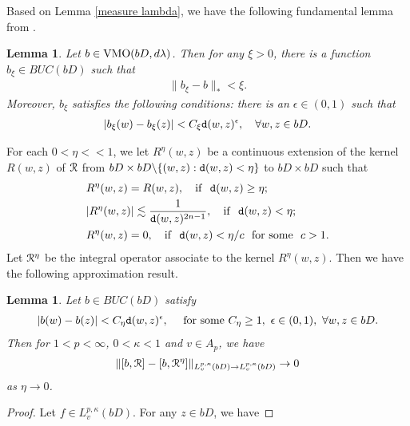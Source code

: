 \documentclass[11pt,a4paper]{amsart}
\numberwithin{equation}{section}
\newtheorem{lemma}[theorem]{Lemma}
\begin{document}
{Based on Lemma \ref{measure lambda}, we have the following  fundamental lemma from \cite[Lemma 1.2]{KL2}. %
\begin{lemma}\label{lemma 1 KL2}
Let $b\in{\rm VMO}(bD, d\lambda)$. Then for any $\xi>0$, there is a function $b_\xi\in BUC(bD)$ such that
\begin{align}\label{f_eta -f}
\|b_\xi -b\|_*<\xi.
\end{align}
Moreover, $b_\xi$ satisfies the following conditions: there is an $\epsilon\in (0,1)$ such that
\begin{align}\label{f_eta}
|b_\xi(w) -b_\xi(z)|<C_\xi {\tt d}(w,z)^\epsilon,\quad \forall w,z\in bD.
\end{align}
\end{lemma}
For each $0<\eta<<1$, we let
$R^\eta(w,z)$ be a continuous extension of the kernel $R(w,z)$ of $\EuScript R$ from $bD\times bD\backslash \{(w,z): {\tt d}(w,z)<\eta\}$ to $bD\times bD$ such that
\begin{align*}
&R^\eta(w,z) =R(w,z),\quad {\rm if}\ \ {\tt d}(w,z)\geq\eta;\\
&|R^\eta(w,z)|\lesssim {1\over {\tt d}(w,z)^{2n-1}}, \quad {\rm if}\ \  {\tt d}(w,z)<\eta;\\
& R^\eta(w,z)=0, \quad {\rm if}\ \  {\tt d}(w,z)<\eta/c\ \ {\text {for some}}\ \ c>1.
\end{align*}
Let $\EuScript R^\eta$ be the integral operator associate to the kernel $R^\eta(w,z)$.
Then we have the following approximation result.
\begin{lemma}\label{lemma 2 KL2}
Let $b\in BUC(bD)$ satisfy
\begin{align}\label{f_eta 1}
|b(w) -b(z)|<C_\eta {\tt d}(w,z)^\epsilon,\quad {\rm\ for\ some\ } C_\eta\geq1,\ \epsilon\in(0,1),\ \forall w,z\in bD.
\end{align}
Then for $1<p<\infty$, $0<\kappa<1$ and $v\in A_p$, we have
$$ \|[b, \EuScript R]-[b, \EuScript R^\eta]\|_{L_v^{p,\kappa}(bD)\to L_v^{p,\kappa}(bD)}\to0 $$
as $\eta\to0$.
\end{lemma}
\begin{proof}
Let $f\in L_v^{p,\kappa}(bD)$. For any $z\in bD$, we have


\end{proof}}
\end{document}

